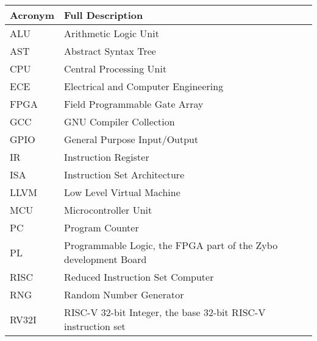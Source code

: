 \begin{table}[H]
	\begin{tabularx}{\textwidth}{| a | x |}
		\hline
		\textbf{Acronym} & \textbf{Full Description}                                       \\
		\hline
		ALU              & Arithmetic Logic Unit                                           \\
		AST              & Abstract Syntax Tree                                            \\
		CPU              & Central Processing Unit                                         \\
		ECE              & Electrical and Computer Engineering                             \\
		FPGA             & Field Programmable Gate Array                                   \\
		GCC              & GNU Compiler Collection                                         \\
		GPIO             & General Purpose Input/Output                                    \\
		IR               & Instruction Register                                            \\
		ISA              & Instruction Set Architecture                                    \\
		LLVM             & Low Level Virtual Machine                                       \\
		MCU              & Microcontroller Unit                                            \\
		PC               & Program Counter                                                 \\
		PL               & Programmable Logic, the FPGA part of the Zybo development Board \\
		RISC             & Reduced Instruction Set Computer                                \\
		RNG              & Random Number Generator                                         \\
		RV32I            & RISC-V 32-bit Integer, the base 32-bit RISC-V instruction set   \\
		\hline
	\end{tabularx}
\end{table}

